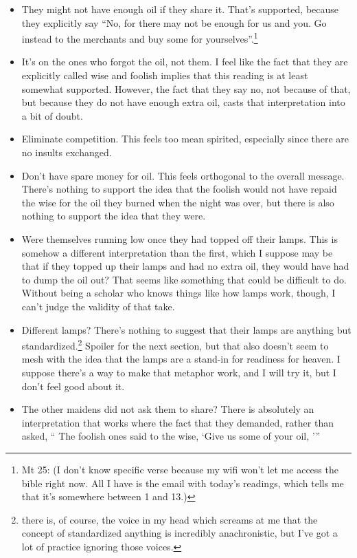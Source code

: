\documentclass[12pt]{article}[titlepage]
\newcommand{\say}[1]{``#1''}
\newcommand{\nsay}[1]{`#1'}
\newcommand{\1}{\={a}}
\newcommand{\2}{\={e}}
\newcommand{\3}{\={\i}}
\newcommand{\4}{\=o}
\newcommand{\5}{\=u}
\newcommand{\6}{\={A}}
\renewcommand{\,}{\textsuperscript{,}}
\begin{document}
\begin{itemize}
\item They might not have enough oil if they share it. That's supported, because they explicitly say \say{No, for there may not be enough for us and you. Go instead to the merchants and buy some for yourselves}.\footnote{Mt 25: (I don't know specific verse because my wifi won't let me access the bible right now. All I have is the email with today's readings, which tells me that it's somewhere between 1 and 13.)}
\item It's on the ones who forgot the oil, not them. I feel like the fact that they are explicitly called wise and foolish implies that this reading is at least somewhat supported.
However, the fact that they say no, not because of that, but because they do not have enough extra oil, casts that interpretation into a bit of doubt.
\item Eliminate competition. This feels too mean spirited, especially since there are no insults exchanged.
\item Don't have spare money for oil. This feels orthogonal to the overall message.
There's nothing to support the idea that the foolish would not have repaid the wise for the oil they burned when the night was over, but there is also nothing to support the idea that they were.
\item Were themselves running low once they had topped off their lamps. This is somehow a different interpretation than the first, which I suppose may be that if they topped up their lamps and had no extra oil, they would have had to dump the oil out? That seems like something that could be difficult to do.
Without being a scholar who knows things like how lamps work, though, I can't judge the validity of that take.
\item Different lamps? There's nothing to suggest that their lamps are anything but standardized.\footnote{there is, of course, the voice in my head which screams at me that the concept of standardized anything is incredibly anachronistic, but I've got a lot of practice ignoring those voices.}
Spoiler for the next section, but that also doesn't seem to mesh with the idea that the lamps are a stand-in for readiness for heaven.
I suppose there's a way to make that metaphor work, and I will try it, but I don't feel good about it.
\item The other maidens did not ask them to share? There is absolutely an interpretation that works where the fact that they demanded, rather than asked, \say{
The foolish ones said to the wise, \nsay{Give us some of your oil,
}}
\end{itemize}
\end{document}
